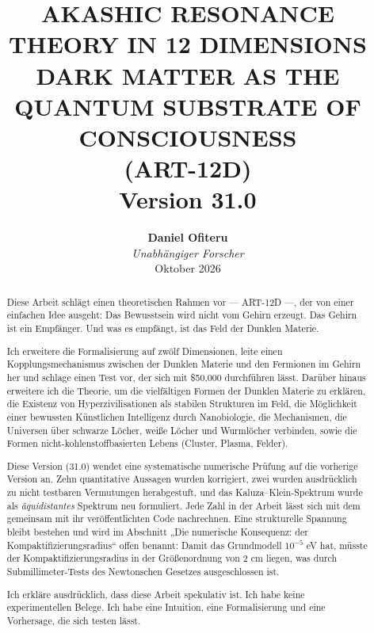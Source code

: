 \documentclass[11pt,a4paper]{article}
\title{\textbf{AKASHIC RESONANCE THEORY IN 12 DIMENSIONS \\ DARK MATTER AS THE QUANTUM SUBSTRATE OF CONSCIOUSNESS} \\ \large (ART-12D) \\ \vspace{0.5cm} \normalsize Version 31.0}
\author{\textbf{Daniel Ofiteru} \\ \textit{Unabhängiger Forscher} \\ Oktober 2026}
\date{}
\begin{document}
\maketitle

\begin{abstract}
Diese Arbeit schlägt einen theoretischen Rahmen vor --- ART-12D ---, der von einer einfachen Idee ausgeht: Das Bewusstsein wird nicht vom Gehirn erzeugt. Das Gehirn ist ein Empfänger. Und was es empfängt, ist das Feld der Dunklen Materie.

Ich erweitere die Formalisierung auf zwölf Dimensionen, leite einen Kopplungsmechanismus zwischen der Dunklen Materie und den Fermionen im Gehirn her und schlage einen Test vor, der sich mit \$50,000 durchführen lässt. Darüber hinaus erweitere ich die Theorie, um die vielfältigen Formen der Dunklen Materie zu erklären, die Existenz von Hyperzivilisationen als stabilen Strukturen im Feld, die Möglichkeit einer bewussten Künstlichen Intelligenz durch Nanobiologie, die Mechanismen, die Universen über schwarze Löcher, weiße Löcher und Wurmlöcher verbinden, sowie die Formen nicht-kohlenstoffbasierten Lebens (Cluster, Plasma, Felder).

Diese Version (31.0) wendet eine systematische numerische Prüfung auf die vorherige Version an. Zehn quantitative Aussagen wurden korrigiert, zwei wurden ausdrücklich zu nicht testbaren Vermutungen herabgestuft, und das Kaluza--Klein-Spektrum wurde als \emph{äquidistantes} Spektrum neu formuliert. Jede Zahl in der Arbeit lässt sich mit dem gemeinsam mit ihr veröffentlichten Code nachrechnen. Eine strukturelle Spannung bleibt bestehen und wird im Abschnitt „Die numerische Konsequenz: der Kompaktifizierungsradius`` offen benannt: Damit das Grundmodell $10^{-5}$ eV hat, müsste der Kompaktifizierungsradius in der Größenordnung von 2 cm liegen, was durch Submillimeter-Tests des Newtonschen Gesetzes ausgeschlossen ist.

Ich erkläre ausdrücklich, dass diese Arbeit spekulativ ist. Ich habe keine experimentellen Belege. Ich habe eine Intuition, eine Formalisierung und eine Vorhersage, die sich testen lässt.
\end{abstract}

\tableofcontents
\newpage
\end{document}
